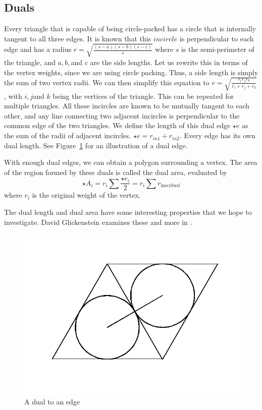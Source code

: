 \documentclass[12pt]{article}
\begin{document}
\subsection{Duals}
\maketitle

Every triangle that is capable of being circle-packed has a circle that is internally tangent to all three edges. It is known that this $incircle$ is perpendicular to each edge and has a radius $\displaystyle r = \sqrt{\frac{(s-a)(s-b)(s-c)}{s}}$ where $s$ is the semi-perimeter of the triangle, and $a, b, $and $c$ are the side lengths. Let us rewrite this in terms of the vertex weights, since we are using circle packing. Thus, a side length is simply the sum of two vertex radii. We can then simplify this equation to $\displaystyle r = \sqrt{\frac{r_i r_j r_k}{r_i + r_j + r_k}}$, with $i, j $and $k$ being the vertices of the triangle. This can be repeated for multiple triangles. All these incircles are known to be mutually tangent to each other, and any line connecting two adjacent incircles is perpendicular to the common edge of the two triangles. We define the length of this dual edge $\star e$ as the sum of the radii of adjacent incircles. $\star e = r_{in1} + r_{in2}$. Every edge has its own dual length. See Figure~\ref{fig:dual} for an illustration of a dual edge.\newline

\noindent With enough dual edges, we can obtain a polygon surrounding a vertex. The area of the region formed by these duals is called the dual area, evaluated by $$\star A_i = r_i\sum{\frac{\star e_i}{2}} = r_i\sum{r_{\mbox{inscribed}}}$$ where $r_i$ is the original weight of the vertex.\newline

\noindent The dual length and dual area have some interesting properties that we hope to investigate. David Glickenstein examines these and more in \cite{Dave}. 

\begin{figure}
\centering
\includegraphics[scale = 0.4]{dual.png}
\caption{A dual to an edge}
\label{fig:dual}
\end{figure} 
\end{document}
